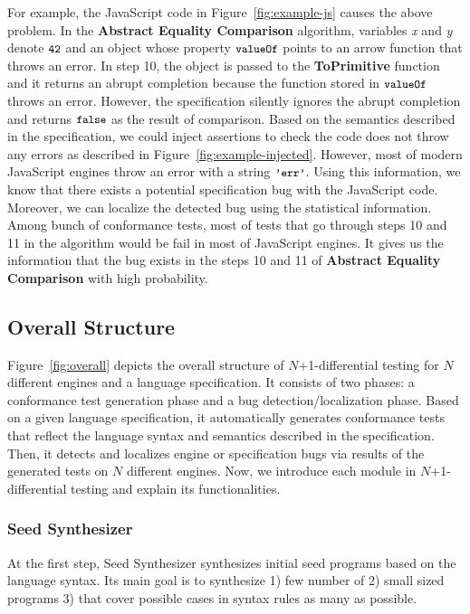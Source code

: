 For example, the JavaScript code in Figure~\ref{fig:example-js} causes the above
problem.  In the \textbf{Abstract Equality Comparison} algorithm, variables
\textit{x} and \textit{y} denote $\code{42}$ and an object whose property
$\code{valueOf}$ points to an arrow function that throws an error.  In step 10,
the object is passed to the \textbf{ToPrimitive} function and it returns an
abrupt completion because the function stored in $\code{valueOf}$ throws an
error.  However, the specification silently ignores the abrupt completion and
returns $\code{false}$ as the result of comparison.  Based on the semantics
described in the specification, we could inject assertions to check the code
does not throw any errors as described in Figure~\ref{fig:example-injected}.
However, most of modern JavaScript engines throw an error with a string
$\code{'err'}$.  Using this information, we know that there exists a potential
specification bug with the JavaScript code.  Moreover, we can localize the
detected bug using the statistical information. Among bunch of conformance
tests, most of tests that go through steps 10 and 11 in the algorithm would be
fail in most of JavaScript engines.  It gives us the information that the bug
exists in the steps 10 and 11 of \textbf{Abstract Equality Comparison} with high
probability.


\subsection{Overall Structure}

Figure~\ref{fig:overall} depicts the overall structure of $N$+1-differential testing
for $N$ different engines and a language specification.  It consists of two
phases: a conformance test generation phase and a bug detection/localization
phase.  Based on a given language specification, it automatically generates
conformance tests that reflect the language syntax and semantics described in
the specification.  Then, it detects and localizes engine or specification bugs
via results of the generated tests on $N$ different engines.  Now, we introduce
each module in $N$+1-differential testing and explain its functionalities.
\newline

\subsubsection{Seed Synthesizer}
At the first step, \textsf{Seed Synthesizer} synthesizes initial seed programs
based on the language syntax.  Its main goal is to synthesize 1) few number of
2) small sized programs 3) that cover possible cases in syntax rules as many as
possible.
\newline

